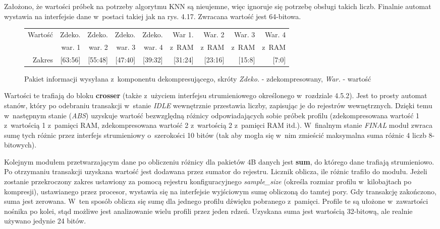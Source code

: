 Założono, że wartości próbek na potrzeby algorytmu KNN są nieujemne, więc ignoruje się potrzebę obsługi takich liczb. Finalnie automat wystawia na interfejsie dane w~postaci takiej jak na rys. 4.17. Zwracana wartość jest 64-bitowa.

\begin{figure}[h]
	\centering
	\begin{tabular}{|r|r|r|r|r|r|r|r|r|}
		\hline
		Wartość & Zdeko. & Zdeko. & Zdeko. & Zdeko. & War 1.  & War. 2  & War. 3  & War. 4\\
				& war. 1  & war. 2  & war. 3  & war. 4	& z~RAM & z~RAM & z~RAM & z~RAM\\
		\hline
		Zakres & [63:56] & [55:48] & [47:40] & [39:32] & [31:24] & [23:16] & [15:8] & [7:0] \\
		\hline
	\end{tabular}
	
	\caption{Pakiet informacji wysyłana z~komponentu dekompresującego, skróty \textit{Zdeko.} - zdekompresowany, \textit{War.} - wartość }
\end{figure}
\FloatBarrier %

Wartości te trafiają do bloku \textbf{crosser} (także z~użyciem interfejsu strumieniowego określonego w~rozdziale 4.5.2). Jest to prosty automat stanów, który po odebraniu transakcji w~stanie \textit{IDLE} wewnętrznie przestawia liczby, zapisując je do rejestrów wewnętrznych. Dzięki temu w~następnym stanie (\textit{ABS}) uzyskuje wartość bezwzględną różnicy odpowiadających sobie próbek profilu (zdekompresowana wartość 1 z~wartością 1 z~pamięci RAM, zdekompresowana wartość 2 z~wartością 2 z~pamięci RAM itd.). W~finalnym stanie \textit{FINAL} moduł zwraca sumę tych różnic przez interfejs strumieniowy o~szerokości 10 bitów (tak aby mogła się w~nim zmieścić maksymalna suma różnic 4 liczb 8-bitowych).

Kolejnym modułem przetwarzającym dane po obliczeniu różnicy dla pakietów 4B danych jest \textbf{sum}, do którego dane trafiają strumieniowo. Po otrzymaniu transakcji uzyskana wartość jest dodawana przez sumator do rejestru. Licznik oblicza, ile różnic trafiło do modułu. Jeżeli zostanie przekroczony zakres ustawiony za pomocą rejestru konfiguracyjnego \textit{sample\_size} (określa rozmiar profilu w~kilobajtach po kompresji), ustawianego przez procesor, wystawia się na interfejsie wyjściowym sumę obliczoną do tamtej pory. Gdy transakcję zakończono, suma jest zerowana. W~ten sposób oblicza się sumę dla jednego profilu dźwięku pobranego z~pamięci. Profile te są ułożone w~zawartości nośnika po kolei, stąd możliwe jest analizowanie wielu profili przez jeden rdzeń. Uzyskana suma jest wartością 32-bitową, ale realnie używano jedynie 24 bitów.

